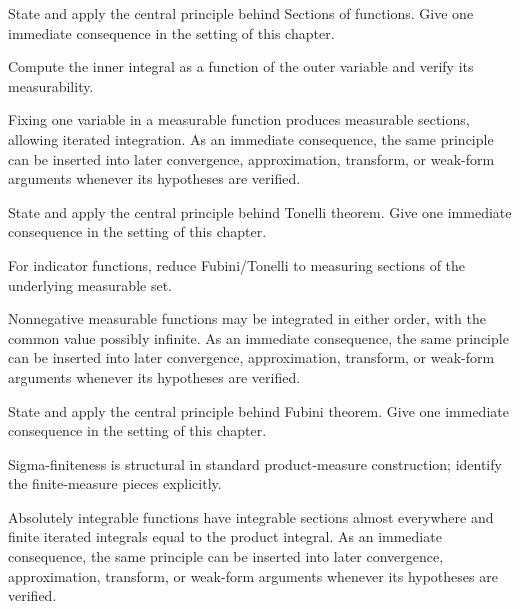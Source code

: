 \begin{exercise}\label{exr:iii05-04}
State and apply the central principle behind Sections of functions. Give one immediate consequence in the setting of this chapter.
\end{exercise}
\begin{hint}
Compute the inner integral as a function of the outer variable and verify its measurability.
\end{hint}
\begin{solution}
Fixing one variable in a measurable function produces measurable sections, allowing iterated integration. As an immediate consequence, the same principle can be inserted into later convergence, approximation, transform, or weak-form arguments whenever its hypotheses are verified.
\end{solution}

\begin{exercise}\label{exr:iii05-05}
State and apply the central principle behind Tonelli theorem. Give one immediate consequence in the setting of this chapter.
\end{exercise}
\begin{hint}
For indicator functions, reduce Fubini/Tonelli to measuring sections of the underlying measurable set.
\end{hint}
\begin{solution}
Nonnegative measurable functions may be integrated in either order, with the common value possibly infinite. As an immediate consequence, the same principle can be inserted into later convergence, approximation, transform, or weak-form arguments whenever its hypotheses are verified.
\end{solution}

\begin{exercise}\label{exr:iii05-06}
State and apply the central principle behind Fubini theorem. Give one immediate consequence in the setting of this chapter.
\end{exercise}
\begin{hint}
Sigma-finiteness is structural in standard product-measure construction; identify the finite-measure pieces explicitly.
\end{hint}
\begin{solution}
Absolutely integrable functions have integrable sections almost everywhere and finite iterated integrals equal to the product integral. As an immediate consequence, the same principle can be inserted into later convergence, approximation, transform, or weak-form arguments whenever its hypotheses are verified.
\end{solution}

